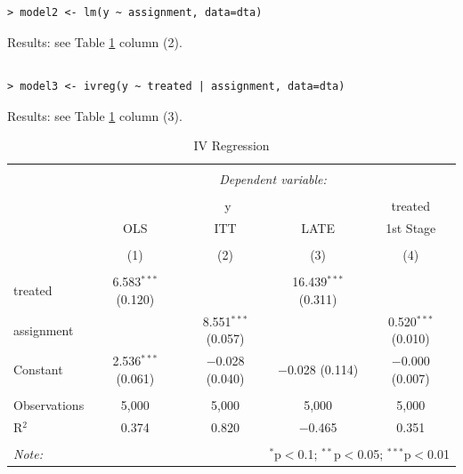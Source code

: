 \documentclass[a4paper]{article}
\begin{document}
\subsection{}
\begin{verbatim}
> model2 <- lm(y ~ assignment, data=dta)
\end{verbatim}
Results: see Table \ref{tab:ivreg} column (2).

\subsection{}
\begin{verbatim}
> model3 <- ivreg(y ~ treated | assignment, data=dta)
\end{verbatim}
Results: see Table \ref{tab:ivreg} column (3).


\begin{table}[!htbp] \centering 
  \caption{IV Regression} 
  \label{tab:ivreg} 
\begin{tabular}{@{\extracolsep{5pt}}lcccc} 
\\[-1.8ex]\hline 
\hline \\[-1.8ex] 
 & \multicolumn{4}{c}{\textit{Dependent variable:}} \\ 
\cline{2-5} 
\\[-1.8ex] & \multicolumn{3}{c}{y} & treated \\ 
 & OLS & ITT & LATE & 1st Stage \\ 
\\[-1.8ex] & (1) & (2) & (3) & (4)\\ 
\hline \\[-1.8ex] 
 treated & 6.583$^{***}$ (0.120) &  & 16.439$^{***}$ (0.311) &  \\ 
  assignment &  & 8.551$^{***}$ (0.057) &  & 0.520$^{***}$ (0.010) \\ 
  Constant & 2.536$^{***}$ (0.061) & $-$0.028 (0.040) & $-$0.028 (0.114) & $-$0.000 (0.007) \\ 
 \hline \\[-1.8ex] 
Observations & 5,000 & 5,000 & 5,000 & 5,000 \\ 
R$^{2}$ & 0.374 & 0.820 & $-$0.465 & 0.351 \\ 
\hline 
\hline \\[-1.8ex] 
\textit{Note:}  & \multicolumn{4}{r}{$^{*}$p$<$0.1; $^{**}$p$<$0.05; $^{***}$p$<$0.01} \\ 
\end{tabular} 
\end{table} 

\end{document}
